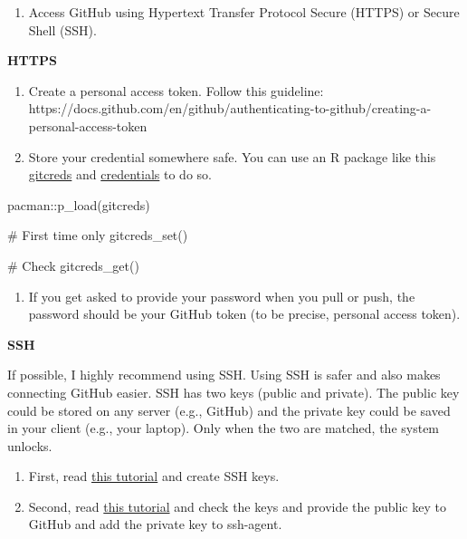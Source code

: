 \documentclass[
  letterpaper,
  DIV=11,
  numbers=noendperiod]{scrreprt}
\newenvironment{Shaded}{\begin{snugshade}}{\end{snugshade}}
\newcommand{\CommentTok}[1]{\textcolor[rgb]{0.37,0.37,0.37}{#1}}
\newcommand{\FunctionTok}[1]{\textcolor[rgb]{0.28,0.35,0.67}{#1}}
\newcommand{\NormalTok}[1]{\textcolor[rgb]{0.00,0.23,0.31}{#1}}
\newcommand{\SpecialCharTok}[1]{\textcolor[rgb]{0.37,0.37,0.37}{#1}}
\providecommand{\tightlist}{%
  \setlength{\itemsep}{0pt}\setlength{\parskip}{0pt}}\usepackage{longtable,booktabs,array}
\begin{document}
\begin{enumerate}
\def\labelenumi{\arabic{enumi}.}
\setcounter{enumi}{2}
\tightlist
\item
  Access GitHub using Hypertext Transfer Protocol Secure (HTTPS) or
  Secure Shell (SSH).
\end{enumerate}

\textbf{HTTPS}

\begin{enumerate}
\def\labelenumi{\arabic{enumi}.}
\item
  Create a personal access token. Follow this guideline:
  https://docs.github.com/en/github/authenticating-to-github/creating-a-personal-access-token
\item
  Store your credential somewhere safe. You can use an R package like
  this \href{https://gitcreds.r-lib.org/}{gitcreds} and
  \href{https://docs.ropensci.org/credentials/}{credentials} to do so.
\end{enumerate}

\begin{Shaded}
\begin{Highlighting}[]
\NormalTok{pacman}\SpecialCharTok{::}\FunctionTok{p\_load}\NormalTok{(gitcreds)}

\CommentTok{\# First time only }
\FunctionTok{gitcreds\_set}\NormalTok{()}

\CommentTok{\# Check }
\FunctionTok{gitcreds\_get}\NormalTok{()}
\end{Highlighting}
\end{Shaded}

\begin{enumerate}
\def\labelenumi{\arabic{enumi}.}
\setcounter{enumi}{2}
\tightlist
\item
  If you get asked to provide your password when you pull or push, the
  password should be your GitHub token (to be precise, personal access
  token).
\end{enumerate}

\textbf{SSH}

If possible, I highly recommend using SSH. Using SSH is safer and also
makes connecting GitHub easier. SSH has two keys (public and private).
The public key could be stored on any server (e.g., GitHub) and the
private key could be saved in your client (e.g., your laptop). Only when
the two are matched, the system unlocks.

\begin{enumerate}
\def\labelenumi{\arabic{enumi}.}
\item
  First, read
  \href{https://docs.github.com/en/github/authenticating-to-github/connecting-to-github-with-ssh}{this
  tutorial} and create SSH keys.
\item
  Second, read \href{https://happygitwithr.com/ssh-keys.html}{this
  tutorial} and check the keys and provide the public key to GitHub and
  add the private key to ssh-agent.
\end{enumerate}
\end{document}
